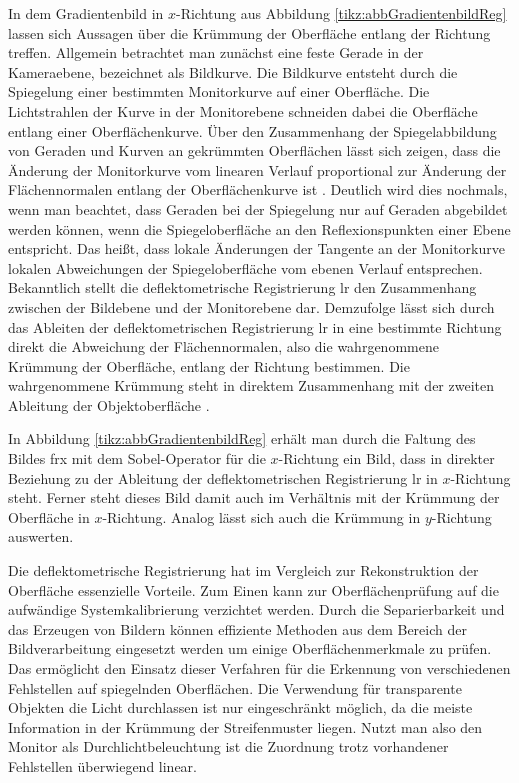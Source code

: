 \p
In dem Gradientenbild in $x$-Richtung aus Abbildung \ref{tikz:abbGradientenbildReg} lassen sich Aussagen über die Krümmung der Oberfläche entlang der Richtung treffen.
Allgemein betrachtet man zu\-nächst eine feste Gerade in der Kameraebene, bezeichnet als Bildkurve.
Die Bildkurve entsteht durch die Spiegelung einer bestimmten Monitorkurve auf einer Oberfläche.
Die Lichtstrahlen der Kurve in der Monitorebene schneiden dabei die Oberfläche entlang einer Oberflächenkurve.
Über den Zusammenhang der Spiegelabbildung von Geraden und Kurven an gekrümmten Oberflächen lässt sich zeigen, dass die Änderung der Monitorkurve vom linearen Verlauf proportional zur Änderung der Flächennormalen entlang der Oberflächenkurve ist \cite{kit_werling}.
Deutlich wird dies nochmals, wenn man beachtet, dass Geraden bei der Spiegelung nur auf Geraden abgebildet werden können, wenn die Spiegeloberfläche an den Reflexionspunkten einer Ebene entspricht.
Das heißt, dass lokale Änderungen der Tangente an der Monitorkurve lokalen Abweichungen der Spiegeloberfläche vom ebenen Verlauf entsprechen.
Bekanntlich stellt die deflektometrische Registrierung \acrshort{lr} den Zusammenhang zwischen der Bildebene und der Monitorebene dar.
Demzufolge lässt sich durch das Ableiten der deflektometrischen Registrierung \acrshort{lr} in eine bestimmte Richtung direkt die Abweichung der Flächennormalen, also die wahrgenommene Krümmung der Oberfläche, entlang der Richtung bestimmen.
Die wahrgenommene Krümmung steht in direktem Zusammenhang mit der zweiten Ableitung der Objektoberfläche \cite{kit_werling}.

\p
In Abbildung \ref{tikz:abbGradientenbildReg} erhält man durch die Faltung des Bildes \acrshort{frx} mit dem Sobel-Operator für die $x$-Richtung ein Bild, dass in direkter Beziehung zu der Ableitung der deflektometrischen Registrierung \acrshort{lr} in  $x$-Richtung steht.
Ferner steht dieses Bild damit auch im Verhältnis mit der Krümmung der Oberfläche in $x$-Richtung.
Analog lässt sich auch die Krümmung in $y$-Richtung auswerten.

\p
Die deflektometrische Registrierung hat im Vergleich zur Rekonstruktion der Oberfläche essenzielle Vorteile.
Zum Einen kann zur Oberflächenprüfung auf die aufwändige Systemkalibrierung verzichtet werden.
Durch die Separierbarkeit und das Erzeugen von Bildern können effiziente Methoden aus dem Bereich der Bildverarbeitung eingesetzt werden um einige Oberflächenmerkmale zu prüfen.
Das ermöglicht den Einsatz dieser Verfahren für die Erkennung von verschiedenen Fehlstellen auf spiegelnden Oberflächen.
Die Verwendung für transparente Objekten die Licht durchlassen ist nur eingeschränkt möglich, da die meiste Information in der Krümmung der Streifenmuster liegen.
Nutzt man also den Monitor als Durchlichtbeleuchtung ist die Zuordnung trotz vorhandener Fehlstellen überwiegend linear.